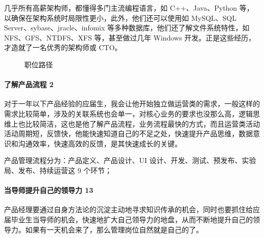 \documentclass[letterpaper,11pt,english]{sphinxmanual}
\begin{document}
几乎所有高薪架构师，都懂得多门主流编程语言，如 C++、Java、Python
等，以确保在架构系统时局限性更小，此外，他们还可以使用如 MySQL、SQL
Server、sybase、jracle、infomix 等多种数据库，他们还了解文件系统特性，如
NFS、GFS、NTDFS、XFS 等，甚至做过几年 Windows
开发。正是这些经历，才造就了一名优秀的架构师或 CTO。

\begin{center}\end{center} 

\begin{figure}[H]
\centering
\capstart

\noindent{}
\caption{职位路径}\label{\detokenize{chapter_experience/career_path:id28}}\end{figure}


\paragraph{了解产品流程 2\sphinxfootnotemark[607]}
\label{\detokenize{chapter_experience/career_path:id16}}%
\begin{footnotetext}[607]\sphinxAtStartFootnote
{}
%
\end{footnotetext}\ignorespaces 
对于一年以下产品经验的应届生，我会让他开始独立做运营类的需求，一般这样的需求比较简单，涉及的关联系统也会单一，对核心业务的要求也没那么高，逻辑思维上也比较简洁，这也是他了解产品流程，业务流程最快的方式，而且运营类活动活动周期短，反馈快，他能快速知道自己的不足之处，快速提升产品思维，数据意识和沟通效率，快速高效的反馈，是其快速成长的关键。

产品管理流程分为：产品定义、产品设计、UI
设计、开发、测试、预发布、实验局、发布、持续运营这 9 个环节；
%
\begin{footnote}[608]\sphinxAtStartFootnote
{}
%
\end{footnote}


\paragraph{当导师提升自己的领导力 13\sphinxfootnotemark[609]}
\label{\detokenize{chapter_experience/career_path:id17}}%
\begin{footnotetext}[609]\sphinxAtStartFootnote
{}
%
\end{footnotetext}\ignorespaces 
产品经理要通过自身方法论的沉淀主动地寻求知识传承的机会，同时也要抓住给应届毕业生当导师的机会，快速地扩大自己领导力的地盘，从而不断地提升自己的领导力。如果有一天机会来了，那么管理岗位自然就是自己的了。
\end{document}
